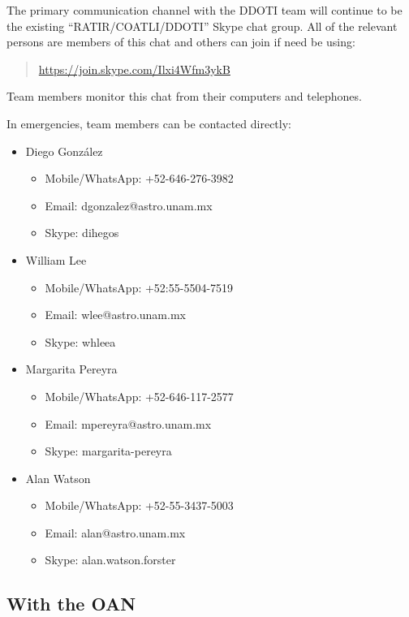\documentclass{article}
\begin{document}
The primary communication channel with the DDOTI team will continue to be the existing “RATIR/COATLI/DDOTI” Skype chat group. All of the relevant persons are members of this chat and others can join if need be using:
\begin{quotation}
\url{https://join.skype.com/Ilxi4Wfm3ykB}
\end{quotation}
Team members monitor this chat from their computers and telephones.

In emergencies, team members can be contacted directly:

\begin{itemize}
\item
Diego González
\begin{itemize}
\item Mobile/WhatsApp: +52-646-276-3982
\item Email: dgonzalez@astro.unam.mx
\item Skype: dihegos
\end{itemize}
\item
William Lee
\begin{itemize}
\item Mobile/WhatsApp: +52:55-5504-7519
\item Email: wlee@astro.unam.mx
\item Skype: whleea
\end{itemize}
\item
Margarita Pereyra
\begin{itemize}
\item Mobile/WhatsApp: +52-646-117-2577
\item Email: mpereyra@astro.unam.mx
\item Skype: margarita-pereyra
\end{itemize}
\item
Alan Watson
\begin{itemize}
\item Mobile/WhatsApp: +52-55-3437-5003
\item Email: alan@astro.unam.mx
\item Skype: alan.watson.forster
\end{itemize}
\end{itemize}

\subsection{With the OAN}
\end{document}
